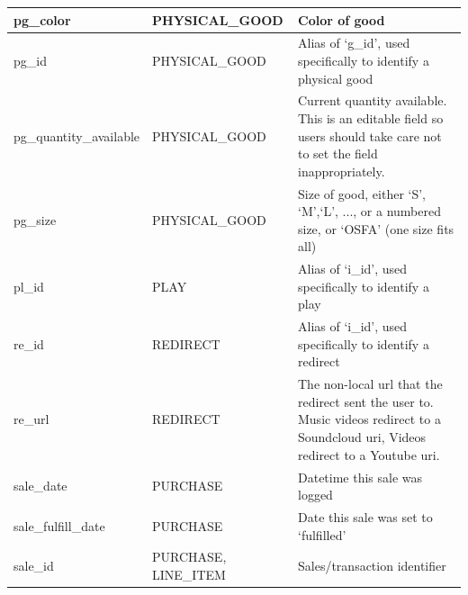 \documentclass[11pt, a4paper]{report}
\begin{document}
\begin{longtable}{|l|p{4.4cm}|p{7cm}|}
pg\_color               & PHYSICAL\_GOOD          & Color of good                                                                                                                                                         \\ \hline
pg\_id                  & PHYSICAL\_GOOD          & Alias of `g\_id', used specifically to identify a physical good                                                                                                       \\ \hline
pg\_quantity\_available & PHYSICAL\_GOOD          & Current quantity available. This is an editable field so users should take care not to set the field inappropriately.                                                 \\ \hline
pg\_size                & PHYSICAL\_GOOD          & Size of good, either `S', `M',`L', ..., or a numbered size, or `OSFA' (one size fits all)                                                                             \\ \hline
pl\_id                  & PLAY                   & Alias of `i\_id', used specifically to identify a play                                                                                                                 \\ \hline
re\_id                  & REDIRECT               & Alias of `i\_id', used specifically to identify a redirect                                                                                                             \\ \hline
re\_url                 & REDIRECT               & The non-local url that the redirect sent the user to. Music videos redirect to a Soundcloud uri, Videos redirect to a Youtube uri.                                    \\ \hline
sale\_date              & PURCHASE               & Datetime this sale was logged                                                                                                                                         \\ \hline
sale\_fulfill\_date     & PURCHASE               & Date this sale was set to `fulfilled'                                                                                                                                 \\ \hline
sale\_id                & PURCHASE, LINE\_ITEM    & Sales/transaction identifier                                                                                                                                          \\ \hline

\end{longtable}
\end{document}
